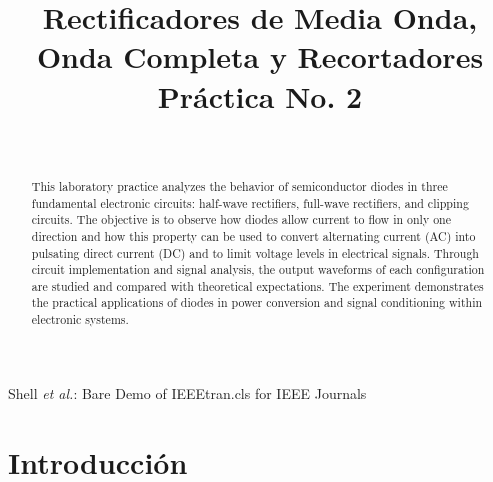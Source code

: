 \documentclass[journal]{IEEEtran}
\begin{document}
\title{Rectificadores de Media Onda, Onda Completa y Recortadores\\ \small{Práctica No. 2}}

\author{
    \\
}
        
{Shell \MakeLowercase{\textit{et al.}}: Bare Demo of IEEEtran.cls for IEEE Journals}

\maketitle

\begin{abstract}
    This laboratory practice analyzes the behavior of semiconductor diodes in three fundamental electronic circuits: half-wave rectifiers, full-wave rectifiers, and clipping circuits. The objective is to observe how diodes allow current to flow in only one direction and how this property can be used to convert alternating current (AC) into pulsating direct current (DC) and to limit voltage 
    levels in electrical signals. Through circuit implementation and signal analysis, the output waveforms of each configuration are studied and compared with theoretical expectations. The experiment demonstrates the practical applications of diodes in power conversion and signal conditioning within electronic systems.
\end{abstract}

\section{Introducción}
\end{document}
